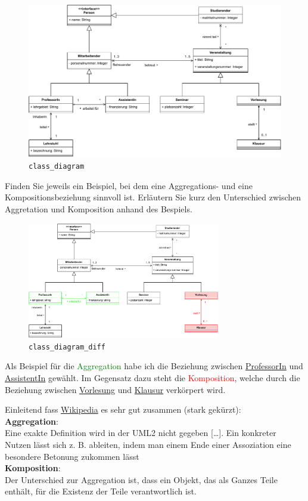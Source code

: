 \documentclass{article}
\newcommand{\gqq}[1]{\glqq{}#1\grqq{}}
\begin{document}
    \begin{figure}[ht]
        \includegraphics[width=\textwidth]{swt_wende_tim_h07_class_diagram.pdf}
        \caption{\texttt{class\_diagram}}
    \end{figure}

    \newpage    
    Finden Sie jeweils ein Beispiel, bei dem eine Aggregations- und eine Kompositionsbeziehung sinnvoll ist.
    Erläutern Sie kurz den Unterschied zwischen Aggretation und Komposition anhand des Bespiels.

    \begin{figure}[ht]
        \centering
        \includegraphics[width=0.75\textwidth]{swt_wende_tim_h07_class_diagram_diff.pdf}
        \caption{\texttt{class\_diagram\_diff}}
    \end{figure}

    Als Beispiel für die \textcolor{green}{Aggregation} habe ich die Beziehung zwischen \underline{ProfessorIn} und \underline{AssistentIn} gewählt.
    Im Gegensatz dazu steht die \textcolor{red}{Komposition}, welche durch die Beziehung zwischen \underline{Vorlesung} und \underline{Klausur} verkörpert wird.

    \vspace{1em}
    Einleitend fass \href{https://de.wikipedia.org/wiki/Assoziation_(UML)}{Wikipedia} es sehr gut zusammen (stark gekürzt):\\
    \textbf{Aggregation}:\\
    \gqq{Eine exakte Definition wird in der UML2 nicht gegeben [\ldots].
    Ein konkreter Nutzen lässt sich z. B. ableiten, indem man einem Ende einer Assoziation eine besondere Betonung zukommen lässt}\\
    \textbf{Komposition}:\\
    Der Unterschied zur Aggregation ist, dass ein Objekt, das als Ganzes Teile enthält, für die Existenz der Teile verantwortlich ist.
\end{document}
